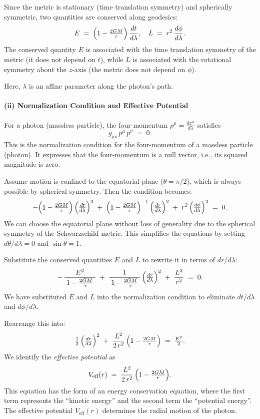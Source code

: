 \documentclass{article}
\begin{document}
Since the metric is stationary (time translation symmetry) and spherically symmetric, two quantities are conserved along geodesics:
\[
E \;=\; \Bigl(1 - \tfrac{2GM}{r}\Bigr)\,\frac{dt}{d\lambda},
\quad
L \;=\; r^{2}\,\frac{d\phi}{d\lambda}.
\]
The conserved quantity \(E\) is associated with the time translation symmetry of the metric (it does not depend on \(t\)), while \(L\) is associated with the rotational symmetry about the \(z\)-axis (the metric does not depend on \(\phi\)).

Here, \(\lambda\) is an affine parameter along the photon's path.

\paragraph{(ii) Normalization Condition and Effective Potential}
For a photon (massless particle), the four-momentum \(p^\mu = \frac{dx^\mu}{d\lambda}\) satisfies
\[
g_{\mu\nu}\,p^\mu\,p^\nu \;=\; 0.
\]
This is the normalization condition for the four-momentum of a massless particle (photon). It expresses that the four-momentum is a null vector, i.e., its squared magnitude is zero.

Assume motion is confined to the equatorial plane (\(\theta = \pi/2\)), which is always possible by spherical symmetry. Then the condition becomes:
\[
-\Bigl(1 - \tfrac{2GM}{r}\Bigr)\,\Bigl(\tfrac{dt}{d\lambda}\Bigr)^2
\;+\;
\Bigl(1 - \tfrac{2GM}{r}\Bigr)^{-1}\,\Bigl(\tfrac{dr}{d\lambda}\Bigr)^2
\;+\;
r^2\,\Bigl(\tfrac{d\phi}{d\lambda}\Bigr)^2
\;=\;0.
\]
We can choose the equatorial plane without loss of generality due to the spherical symmetry of the Schwarzschild metric. This simplifies the equations by setting \(d\theta/d\lambda = 0\) and \(\sin\theta = 1\).

Substitute the conserved quantities \(E\) and \(L\) to rewrite it in terms of \(dr/d\lambda\):
\[
-\,\frac{E^2}{\;1 - \frac{2GM}{r}\;}
\;+\;
\frac{1}{\;1 - \frac{2GM}{r}\;}\,\Bigl(\tfrac{dr}{d\lambda}\Bigr)^2
\;+\;
\frac{L^2}{\,r^2\,}
\;=\;0.
\]
We have substituted \(E\) and \(L\) into the normalization condition to eliminate \(dt/d\lambda\) and \(d\phi/d\lambda\).

Rearrange this into:
\[
\tfrac12\,\Bigl(\tfrac{dr}{d\lambda}\Bigr)^2
\;+\;
\frac{L^2}{2\,r^2}\,\Bigl(1-\tfrac{2GM}{r}\Bigr)
\;=\;
\tfrac{E^2}{2}.
\]
We identify the \emph{effective potential} as
\[
V_{\text{eff}}(r)
\;=\;
\frac{L^2}{2\,r^2}\,\Bigl(1-\tfrac{2GM}{r}\Bigr).
\]
This equation has the form of an energy conservation equation, where the first term represents the ``kinetic energy'' and the second term the ``potential energy''. The effective potential \(V_{\text{eff}}(r)\) determines the radial motion of the photon.
\end{document}
